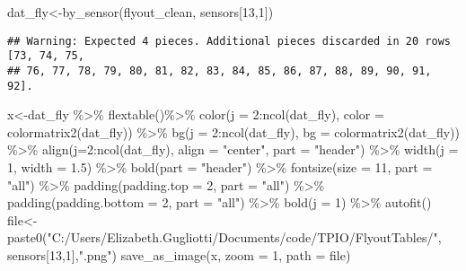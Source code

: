 \documentclass[
]{article}
\newenvironment{Shaded}{\begin{snugshade}}{\end{snugshade}}
\newcommand{\AttributeTok}[1]{\textcolor[rgb]{0.77,0.63,0.00}{#1}}
\newcommand{\DecValTok}[1]{\textcolor[rgb]{0.00,0.00,0.81}{#1}}
\newcommand{\FloatTok}[1]{\textcolor[rgb]{0.00,0.00,0.81}{#1}}
\newcommand{\FunctionTok}[1]{\textcolor[rgb]{0.00,0.00,0.00}{#1}}
\newcommand{\NormalTok}[1]{#1}
\newcommand{\OtherTok}[1]{\textcolor[rgb]{0.56,0.35,0.01}{#1}}
\newcommand{\SpecialCharTok}[1]{\textcolor[rgb]{0.00,0.00,0.00}{#1}}
\newcommand{\StringTok}[1]{\textcolor[rgb]{0.31,0.60,0.02}{#1}}
\begin{document}
\begin{Shaded}
\begin{Highlighting}[]
\NormalTok{dat\_fly}\OtherTok{\textless{}{-}}\FunctionTok{by\_sensor}\NormalTok{(flyout\_clean, sensors[}\DecValTok{13}\NormalTok{,}\DecValTok{1}\NormalTok{])}
\end{Highlighting}
\end{Shaded}

\begin{verbatim}
## Warning: Expected 4 pieces. Additional pieces discarded in 20 rows [73, 74, 75,
## 76, 77, 78, 79, 80, 81, 82, 83, 84, 85, 86, 87, 88, 89, 90, 91, 92].
\end{verbatim}

\begin{Shaded}
\begin{Highlighting}[]
\NormalTok{x}\OtherTok{\textless{}{-}}\NormalTok{dat\_fly }\SpecialCharTok{\%\textgreater{}\%}
    \FunctionTok{flextable}\NormalTok{()}\SpecialCharTok{\%\textgreater{}\%}
    \FunctionTok{color}\NormalTok{(}\AttributeTok{j =} \DecValTok{2}\SpecialCharTok{:}\FunctionTok{ncol}\NormalTok{(dat\_fly), }\AttributeTok{color =} \FunctionTok{colormatrix2}\NormalTok{(dat\_fly)) }\SpecialCharTok{\%\textgreater{}\%}
    \FunctionTok{bg}\NormalTok{(}\AttributeTok{j =} \DecValTok{2}\SpecialCharTok{:}\FunctionTok{ncol}\NormalTok{(dat\_fly), }\AttributeTok{bg =} \FunctionTok{colormatrix2}\NormalTok{(dat\_fly)) }\SpecialCharTok{\%\textgreater{}\%}
    \FunctionTok{align}\NormalTok{(}\AttributeTok{j=}\DecValTok{2}\SpecialCharTok{:}\FunctionTok{ncol}\NormalTok{(dat\_fly), }\AttributeTok{align =} \StringTok{"center"}\NormalTok{, }\AttributeTok{part =} \StringTok{"header"}\NormalTok{) }\SpecialCharTok{\%\textgreater{}\%}
    \FunctionTok{width}\NormalTok{(}\AttributeTok{j =} \DecValTok{1}\NormalTok{, }\AttributeTok{width =} \FloatTok{1.5}\NormalTok{) }\SpecialCharTok{\%\textgreater{}\%}
    \FunctionTok{bold}\NormalTok{(}\AttributeTok{part =} \StringTok{"header"}\NormalTok{) }\SpecialCharTok{\%\textgreater{}\%}
    \FunctionTok{fontsize}\NormalTok{(}\AttributeTok{size =} \DecValTok{11}\NormalTok{, }\AttributeTok{part =} \StringTok{"all"}\NormalTok{) }\SpecialCharTok{\%\textgreater{}\%}
    \FunctionTok{padding}\NormalTok{(}\AttributeTok{padding.top =} \DecValTok{2}\NormalTok{, }\AttributeTok{part =} \StringTok{"all"}\NormalTok{) }\SpecialCharTok{\%\textgreater{}\%}
    \FunctionTok{padding}\NormalTok{(}\AttributeTok{padding.bottom =} \DecValTok{2}\NormalTok{, }\AttributeTok{part =} \StringTok{"all"}\NormalTok{) }\SpecialCharTok{\%\textgreater{}\%}
    \FunctionTok{bold}\NormalTok{(}\AttributeTok{j =} \DecValTok{1}\NormalTok{) }\SpecialCharTok{\%\textgreater{}\%} \FunctionTok{autofit}\NormalTok{()}
\NormalTok{file}\OtherTok{\textless{}{-}}\FunctionTok{paste0}\NormalTok{(}\StringTok{"C:/Users/Elizabeth.Gugliotti/Documents/code/TPIO/FlyoutTables/"}\NormalTok{, sensors[}\DecValTok{13}\NormalTok{,}\DecValTok{1}\NormalTok{],}\StringTok{".png"}\NormalTok{)}
\FunctionTok{save\_as\_image}\NormalTok{(x, }\AttributeTok{zoom =} \DecValTok{1}\NormalTok{, }\AttributeTok{path =}\NormalTok{ file)}
\end{Highlighting}
\end{Shaded}
\end{document}
